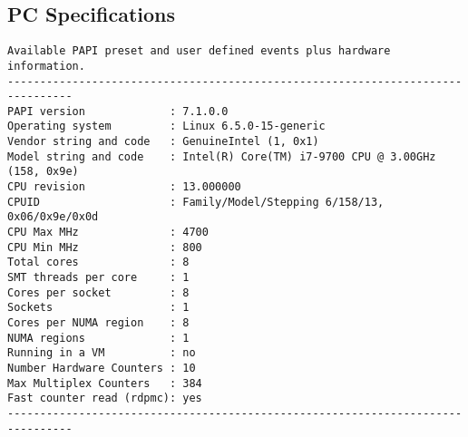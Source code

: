 \subsection{PC Specifications}

\begin{verbatim}
Available PAPI preset and user defined events plus hardware information.
--------------------------------------------------------------------------------
PAPI version             : 7.1.0.0
Operating system         : Linux 6.5.0-15-generic
Vendor string and code   : GenuineIntel (1, 0x1)
Model string and code    : Intel(R) Core(TM) i7-9700 CPU @ 3.00GHz (158, 0x9e)
CPU revision             : 13.000000
CPUID                    : Family/Model/Stepping 6/158/13, 0x06/0x9e/0x0d
CPU Max MHz              : 4700
CPU Min MHz              : 800
Total cores              : 8
SMT threads per core     : 1
Cores per socket         : 8
Sockets                  : 1
Cores per NUMA region    : 8
NUMA regions             : 1
Running in a VM          : no
Number Hardware Counters : 10
Max Multiplex Counters   : 384
Fast counter read (rdpmc): yes
--------------------------------------------------------------------------------


\end{verbatim}
